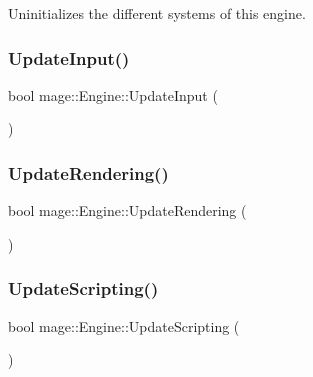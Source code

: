 Uninitializes the different systems of this engine. \hypertarget{classmage_1_1_engine_ad35eef077bc695803769a385e2751cbe}{}\label{classmage_1_1_engine_ad35eef077bc695803769a385e2751cbe} 
\subsubsection{\texorpdfstring{Update\+Input()}{UpdateInput()}}
{\footnotesize\ttfamily bool mage\+::\+Engine\+::\+Update\+Input (\begin{DoxyParamCaption}{ }\end{DoxyParamCaption})\hspace{0.3cm}{\ttfamily [private]}}

\hypertarget{classmage_1_1_engine_a5a39d76019d51290a5ba305c57384fae}{}\label{classmage_1_1_engine_a5a39d76019d51290a5ba305c57384fae} 
\subsubsection{\texorpdfstring{Update\+Rendering()}{UpdateRendering()}}
{\footnotesize\ttfamily bool mage\+::\+Engine\+::\+Update\+Rendering (\begin{DoxyParamCaption}{ }\end{DoxyParamCaption})\hspace{0.3cm}{\ttfamily [private]}}

\hypertarget{classmage_1_1_engine_a3c7a55a89a23952a368432f933a90d26}{}\label{classmage_1_1_engine_a3c7a55a89a23952a368432f933a90d26} 
\subsubsection{\texorpdfstring{Update\+Scripting()}{UpdateScripting()}}
{\footnotesize\ttfamily bool mage\+::\+Engine\+::\+Update\+Scripting (\begin{DoxyParamCaption}{ }\end{DoxyParamCaption})\hspace{0.3cm}{\ttfamily [private]}}



